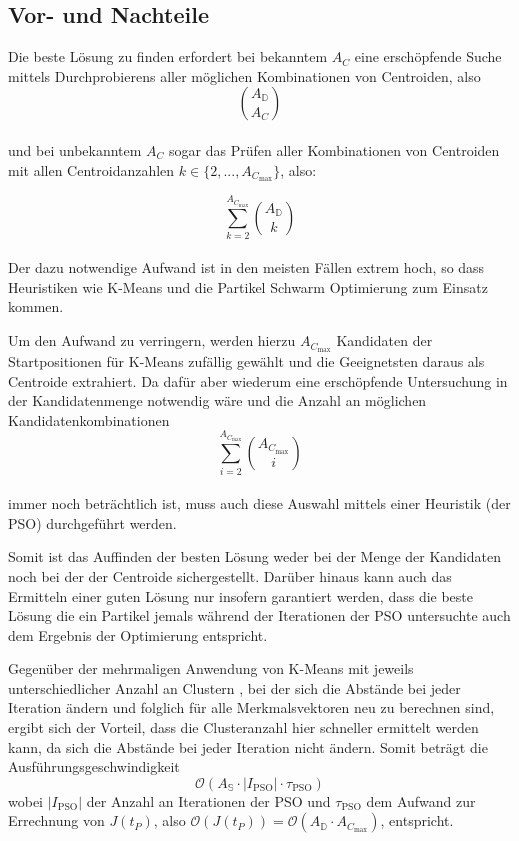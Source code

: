 \subsection{Vor- und Nachteile}
  Die beste Lösung zu finden erfordert bei bekanntem $A_C$ eine erschöpfende Suche mittels Durchprobierens aller möglichen Kombinationen von Centroiden, also
  \begin{equation}
    {A_\mathbb{D}\choose A_C}
  \end{equation}\\
  und bei unbekanntem $A_C$ sogar das Prüfen aller Kombinationen von Centroiden mit allen Centroidanzahlen $k\in\{2, ..., A_{C_\textrm{max}}\}$, also:

  \begin{equation}
    \sum\limits_{k=2}^{A_{C_\textrm{max}}} {A_\mathbb{D}\choose k}
  \end{equation}\\
  Der dazu notwendige Aufwand ist in den meisten Fällen extrem hoch, so dass Heuristiken wie K-Means und die Partikel Schwarm Optimierung zum Einsatz kommen.

  Um den Aufwand zu verringern, werden hierzu $A_{C_\textrm{max}}$ Kandidaten der Startpositionen für K-Means zufällig gewählt und die Geeignetsten daraus als Centroide extrahiert. Da dafür aber wiederum eine erschöpfende Untersuchung in der Kandidatenmenge notwendig wäre und die Anzahl an möglichen Kandidatenkombinationen
  \begin{equation}
    \sum\limits_{i=2}^{A_{C_\textrm{max}}}{A_{C_\textrm{max}}\choose i}
  \end{equation}\\
  immer noch beträchtlich ist, muss auch diese Auswahl mittels einer Heuristik (der PSO) durchgeführt werden.

  Somit ist das Auffinden der besten Lösung weder bei der Menge der Kandidaten noch bei der der Centroide sichergestellt. Darüber hinaus kann auch das Ermitteln einer guten Lösung nur insofern garantiert werden, dass die beste Lösung die ein Partikel jemals während der Iterationen der PSO untersuchte auch dem Ergebnis der Optimierung entspricht.
 
  Gegenüber der mehrmaligen Anwendung von K-Means mit jeweils unterschiedlicher Anzahl an Clustern \cite{Ray1999}, bei der sich die Abstände bei jeder Iteration ändern und folglich für alle Merkmalsvektoren neu zu berechnen sind, ergibt sich der Vorteil, dass die Clusteranzahl hier schneller ermittelt werden kann, da sich die Abstände bei jeder Iteration nicht ändern.
  Somit beträgt die Ausführungsgeschwindigkeit
  \begin{equation}
    \mathcal O(A_\mathbb{S} \cdot |I_\textrm{PSO}| \cdot \tau_\textrm{PSO})
  \end{equation}  
  wobei $|I_\textrm{PSO}|$ der Anzahl an Iterationen der PSO und $\tau_\textrm{PSO}$ dem Aufwand zur Errechnung von $J(t_P)$, also $\mathcal O(J(t_P)) = \mathcal O(A_\mathbb{D} \cdot A_{C_\textrm{max}})$, entspricht. 

